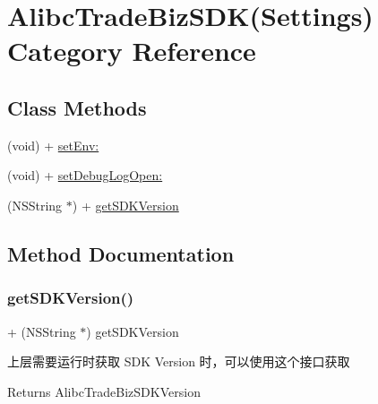 \hypertarget{category_alibc_trade_biz_s_d_k_07_settings_08}{}\section{Alibc\+Trade\+Biz\+S\+DK(Settings) Category Reference}
\label{category_alibc_trade_biz_s_d_k_07_settings_08}
\subsection*{Class Methods}
\begin{DoxyCompactItemize}
\item 
(void) + \mbox{\hyperlink{category_alibc_trade_biz_s_d_k_07_settings_08_a41090673f57d4176b8b448a31b5abb28}{set\+Env\+:}}
\item 
(void) + \mbox{\hyperlink{category_alibc_trade_biz_s_d_k_07_settings_08_a6f1e1ff2c21b052128dcc6cf3350a3e6}{set\+Debug\+Log\+Open\+:}}
\item 
(N\+S\+String $\ast$) + \mbox{\hyperlink{category_alibc_trade_biz_s_d_k_07_settings_08_ade9e15def0980530603b5f9370de7725}{get\+S\+D\+K\+Version}}
\end{DoxyCompactItemize}


\subsection{Method Documentation}
\mbox{\label{category_alibc_trade_biz_s_d_k_07_settings_08_ade9e15def0980530603b5f9370de7725}} 
\subsubsection{\texorpdfstring{get\+S\+D\+K\+Version()}{getSDKVersion()}}
{\footnotesize\ttfamily + (N\+S\+String $\ast$) get\+S\+D\+K\+Version \begin{DoxyParamCaption}{ }\end{DoxyParamCaption}}

上层需要运行时获取 S\+DK Version 时，可以使用这个接口获取

\begin{DoxyReturn}{Returns}
Alibc\+Trade\+Biz\+S\+D\+K\+Version 
\end{DoxyReturn}


